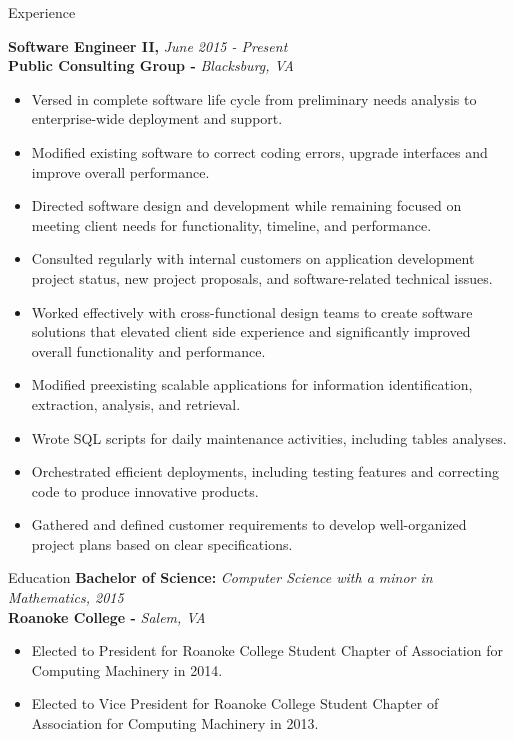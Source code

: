 \documentclass{resume} %
\begin{document}
\begin{rSection}{Experience}

{\bf Software Engineer II, }{\em June 2015 - Present} 
\\
{\bf Public Consulting Group -  }{\em Blacksburg, VA}
\begin{itemize}
\item Versed in complete software life cycle from preliminary needs analysis to enterprise-wide deployment and support.
\item Modified existing software to correct coding errors, upgrade interfaces and improve overall performance.
\item Directed software design and development while remaining focused on meeting client needs for functionality, timeline, and performance.
\item Consulted regularly with internal customers on application development project status, new project proposals, and software-related technical issues.
\item Worked effectively with cross-functional design teams to create software solutions that elevated client side experience and significantly improved overall functionality and performance.
\item Modified preexisting scalable applications for information identification, extraction, analysis, and retrieval.
\item Wrote SQL scripts for daily maintenance activities, including tables analyses.
\item Orchestrated efficient deployments, including testing features and correcting code to produce innovative products.
\item Gathered and defined customer requirements to develop well-organized project plans based on clear specifications.
\end{itemize}
\end{rSection}

\begin{rSection}{Education}
{\bf Bachelor of Science: }{\em Computer Science with a minor in Mathematics, 2015} 
\\
{\bf Roanoke College -  }{\em Salem, VA}
\begin{itemize}
\item Elected to President for Roanoke College Student Chapter of Association for Computing Machinery in 2014.
\item Elected to Vice President for Roanoke College Student Chapter of Association for Computing Machinery in 2013.
\end{itemize}
\end{rSection}
\end{document}
